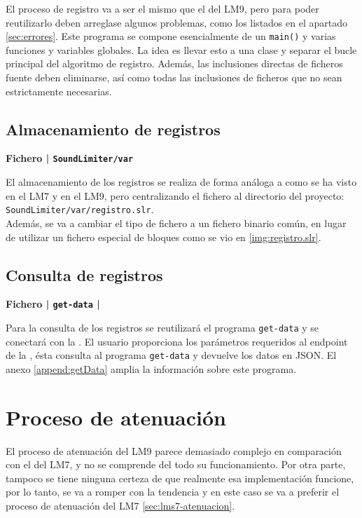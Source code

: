 El proceso de registro va a ser el mismo que el del \acrshort{LM9}, pero para poder reutilizarlo deben arreglase algunos problemas, como los listados en el apartado \ref{sec:errores}. Este programa se compone esencialmente de un \texttt{main()} y varias funciones y variables globales. La idea es llevar esto a una clase y separar el bucle principal del algoritmo de registro. Además, las inclusiones directas de ficheros fuente deben eliminarse, así como todas las inclusiones de ficheros que no sean estrictamente necesarias.

\subsection{Almacenamiento de registros}

\begin{flushright}
\textbf{Fichero | \texttt{SoundLimiter/var}}
\end{flushright}

El almacenamiento de los registros se realiza de forma análoga a como se ha visto en el \acrshort{LM7} y en el \acrshort{LM9}, pero centralizando el fichero al directorio del proyecto: \texttt{SoundLimiter/var/registro.slr}.\\
Además, se va a cambiar el tipo de fichero a un fichero binario común, en lugar de utilizar un fichero especial de bloques como se vio en \ref{img:registro.slr}.

\subsection{Consulta de registros}

\begin{flushright}
\textbf{Fichero | \texttt{get-data} | }
\end{flushright}

Para la consulta de los registros se reutilizará el programa \texttt{get-data} y se conectará con la . El usuario proporciona los parámetros requeridos al endpoint de la , ésta consulta al programa \texttt{get-data} y devuelve los datos en \acrshort{JSON}. El anexo \ref{append:getData} amplia la información sobre este programa.

\section{Proceso de atenuación}

El proceso de atenuación del \acrshort{LM9} parece demasiado complejo en comparación con el del \acrshort{LM7}, y no se comprende del todo su funcionamiento. Por otra parte, tampoco se tiene ninguna certeza de que realmente esa implementación funcione, por lo tanto, se va a romper con la tendencia y en este caso se va a preferir el proceso de atenuación del \acrshort{LM7} \ref{sec:lms7-atenuacion}.

